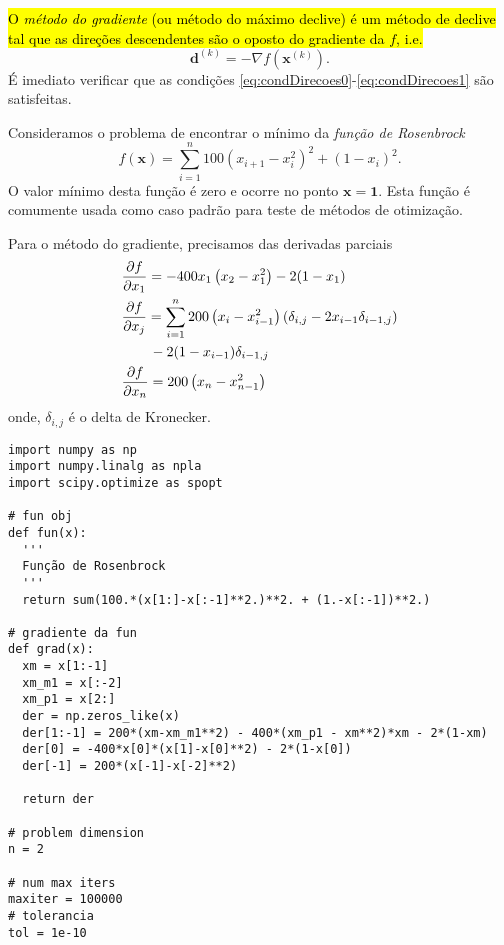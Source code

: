 \hl{O \emph{método do gradiente} (ou método do máximo declive) é um método de declive tal que as direções descendentes são o oposto do gradiente da $f$, i.e.}
\begin{equation}
  \pmb{d}^{(k)} = -\nabla f(\pmb{x}^{(k)}).
\end{equation}
É imediato verificar que as condições \eqref{eq:condDirecoes0}-\eqref{eq:condDirecoes1} são satisfeitas.

\begin{ex}\label{ex:Rosenbrock}
  Consideramos o problema de encontrar o mínimo da \emph{função de Rosenbrock}{\rosenbrock}
  \begin{equation}
    f(\pmb{x}) = \sum_{i=1}^n 100\left(x_{i+1}-x_i^2\right)^2 + (1-x_i)^2.
  \end{equation}
  O valor mínimo desta função é zero e ocorre no ponto $\pmb{x} = \pmb{1}$. Esta função é comumente usada como caso padrão para teste de métodos de otimização.

  Para o método do gradiente, precisamos das derivadas parciais
  \begin{align}
    & \frac{\partial f}{\partial x_1} = -400x_1\left(x_2-x_1^2\right) - 2(1-x_1) \\
    &  \frac{\partial f}{\partial x_j} = \sum_{i=1}^n 200\left(x_i-x_{i-1}^2\right)(\delta_{i,j} - 2x_{i-1}\delta_{i-1,j}) \nonumber\\
    &\qquad - 2(1-x_{i-1})\delta_{i-1,j} \\
    & \frac{\partial f}{\partial x_{n}} = 200\left(x_n - x_{n-1}^2\right)
  \end{align}
  onde, $\delta_{i,j}$ é o delta de Kronecker{\kronecker}.


\begin{lstlisting}[caption=Algoritmo do Gradiente, label={lst:algOtimMG}]
import numpy as np
import numpy.linalg as npla
import scipy.optimize as spopt

# fun obj
def fun(x):
  '''
  Função de Rosenbrock
  '''
  return sum(100.*(x[1:]-x[:-1]**2.)**2. + (1.-x[:-1])**2.)

# gradiente da fun
def grad(x):
  xm = x[1:-1]
  xm_m1 = x[:-2]
  xm_p1 = x[2:]
  der = np.zeros_like(x)
  der[1:-1] = 200*(xm-xm_m1**2) - 400*(xm_p1 - xm**2)*xm - 2*(1-xm)
  der[0] = -400*x[0]*(x[1]-x[0]**2) - 2*(1-x[0])
  der[-1] = 200*(x[-1]-x[-2]**2)
  
  return der

# problem dimension
n = 2

# num max iters
maxiter = 100000
# tolerancia
tol = 1e-10


\end{lstlisting}
\end{ex}
